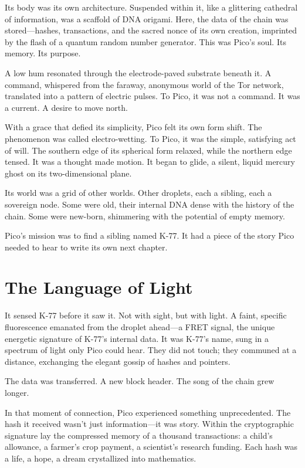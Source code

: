 \documentclass[12pt,a4paper]{book}
\begin{document}
Its body was its own architecture. Suspended within it, like a glittering cathedral of information, was a scaffold of DNA origami. Here, the data of the chain was stored—hashes, transactions, and the sacred nonce of its own creation, imprinted by the flash of a quantum random number generator. This was Pico's soul. Its memory. Its purpose.

A low hum resonated through the electrode-paved substrate beneath it. A command, whispered from the faraway, anonymous world of the Tor network, translated into a pattern of electric pulses. To Pico, it was not a command. It was a current. A desire to move north.

With a grace that defied its simplicity, Pico felt its own form shift. The phenomenon was called electro-wetting. To Pico, it was the simple, satisfying act of will. The southern edge of its spherical form relaxed, while the northern edge tensed. It was a thought made motion. It began to glide, a silent, liquid mercury ghost on its two-dimensional plane.

Its world was a grid of other worlds. Other droplets, each a sibling, each a sovereign node. Some were old, their internal DNA dense with the history of the chain. Some were new-born, shimmering with the potential of empty memory.

Pico's mission was to find a sibling named K-77. It had a piece of the story Pico needed to hear to write its own next chapter.

\section{The Language of Light}

It sensed K-77 before it saw it. Not with sight, but with light. A faint, specific fluorescence emanated from the droplet ahead—a FRET signal, the unique energetic signature of K-77's internal data. It was K-77's name, sung in a spectrum of light only Pico could hear. They did not touch; they communed at a distance, exchanging the elegant gossip of hashes and pointers.

The data was transferred. A new block header. The song of the chain grew longer.

In that moment of connection, Pico experienced something unprecedented. The hash it received wasn't just information—it was story. Within the cryptographic signature lay the compressed memory of a thousand transactions: a child's allowance, a farmer's crop payment, a scientist's research funding. Each hash was a life, a hope, a dream crystallized into mathematics.
\end{document}
